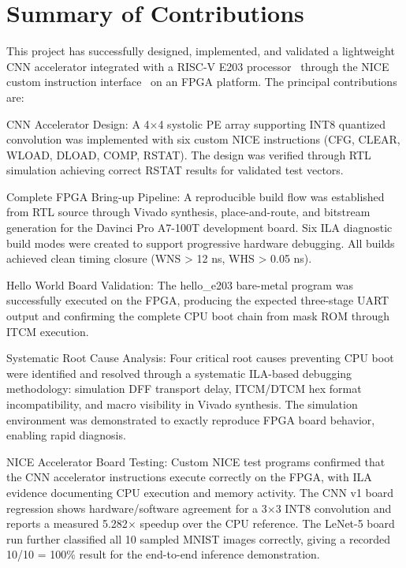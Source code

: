

\section{Summary of Contributions}\label{sec:6_1}

This project has successfully designed, implemented, and validated a lightweight CNN accelerator integrated with a RISC-V E203 processor~\cite{NUCLEI_E203} through the NICE custom instruction interface~\cite{NUCLEI_NICE} on an FPGA platform. The principal contributions are:


CNN Accelerator Design: A 4$\times$4 systolic PE array supporting INT8 quantized convolution was implemented with six custom NICE instructions (CFG, CLEAR, WLOAD, DLOAD, COMP, RSTAT). The design was verified through RTL simulation achieving correct RSTAT results for validated test vectors.


Complete FPGA Bring-up Pipeline: A reproducible build flow was established from RTL source through Vivado synthesis, place-and-route, and bitstream generation for the Davinci Pro A7-100T development board. Six ILA diagnostic build modes were created to support progressive hardware debugging. All builds achieved clean timing closure (WNS > 12 ns, WHS > 0.05 ns).


Hello World Board Validation: The hello\_e203 bare-metal program was successfully executed on the FPGA, producing the expected three-stage UART output and confirming the complete CPU boot chain from mask ROM through ITCM execution.


Systematic Root Cause Analysis: Four critical root causes preventing CPU boot were identified and resolved through a systematic ILA-based debugging methodology: simulation DFF transport delay, ITCM/DTCM hex format incompatibility, and macro visibility in Vivado synthesis. The simulation environment was demonstrated to exactly reproduce FPGA board behavior, enabling rapid diagnosis.


NICE Accelerator Board Testing: Custom NICE test programs confirmed that the CNN accelerator instructions execute correctly on the FPGA, with ILA evidence documenting CPU execution and memory activity. The CNN v1 board regression shows hardware/software agreement for a 3$\times$3 INT8 convolution and reports a measured 5.282$\times$ speedup over the CPU reference. The LeNet-5 board run further classified all 10 sampled MNIST images correctly, giving a recorded 10/10 = 100\% result for the end-to-end inference demonstration.


